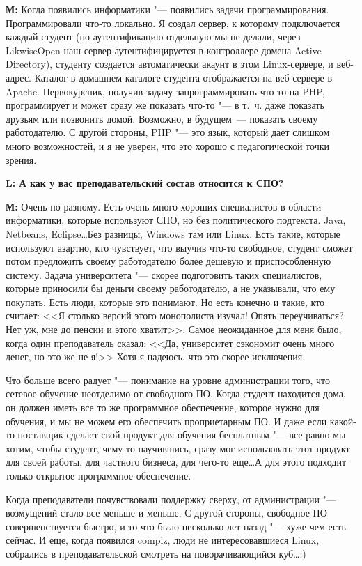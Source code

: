 \documentclass[10pt, a5paper]{article}
\begin{document}
{\noindent \bf М:} Когда появились информатики "--- появились задачи программирования. Программировали что-то локально. Я  создал сервер, к которому подключается каждый студент (но аутентификацию отдельную мы не делали, через LikwiseOpen наш сервер аутентифицируется в контроллере домена Active Directory), студенту создается автоматически акаунт в этом Linux-сервере, и веб-адрес. Каталог в домашнем каталоге студента отображается на веб-сервере в Apache. Первокурсник, получив задачу запрограммировать что-то на PHP, программирует и может сразу же показать что-то "--- в т.~ч. даже показать друзьям или позвонить домой. Возможно, в будущем~--- показать своему работодателю. С другой стороны, PHP "--- это язык, который дает слишком много возможностей, и я не уверен, что это хорошо с педагогической точки зрения.

{\noindent \bf L: А как у вас преподавательский состав относится к СПО?}

{\noindent \bf М:} Очень по-разному. Есть очень много хороших специалистов в области информатики, которые используют СПО, но без политического подтекста. Java, Netbeans, Eclipse\ldots Без разницы, Windows там или Linux. Есть такие, которые используют азартно, кто чувствует, что выучив что-то свободное, студент сможет потом предложить своему работодателю более дешевую и приспособленную систему. Задача университета "--- скорее подготовить таких специалистов, которые приносили бы деньги своему работодателю, а не указывали, что ему покупать. Есть люди, которые это понимают. Но есть конечно и такие, кто считает: <<Я столько версий этого монополиста изучал! Опять переучиваться? Нет уж, мне до пенсии и этого хватит>>. Самое неожиданное для меня было, когда один преподаватель сказал: <<Да, университет сэкономит очень много денег, но это же не я!>> Хотя я надеюсь, что это скорее исключения. 

Что больше всего радует "--- понимание на уровне администрации того, что сетевое обучение неотделимо от свободного ПО. Когда студент находится дома, он должен иметь все то же программное обеспечение, которое нужно для обучения, и мы не можем его обеспечить проприетарным ПО. И даже если какой-то поставщик сделает свой продукт для обучения бесплатным "--- все равно мы хотим, чтобы студент, чему-то научившись, сразу мог использовать этот продукт для своей работы, для частного бизнеса, для чего-то еще\ldots А для этого подходит только открытое программное обеспечение. 

Когда преподаватели почувствовали поддержку сверху, от администрации "--- возмущений стало все меньше и меньше. С другой стороны, свободное ПО совершенствуется быстро, и то что было несколько лет назад "--- хуже чем есть сейчас. И еще, когда появился compiz, люди не интересовавшиеся Linux, собрались в преподавательской смотреть на поворачивающийся куб\ldots :) 
\end{document}
